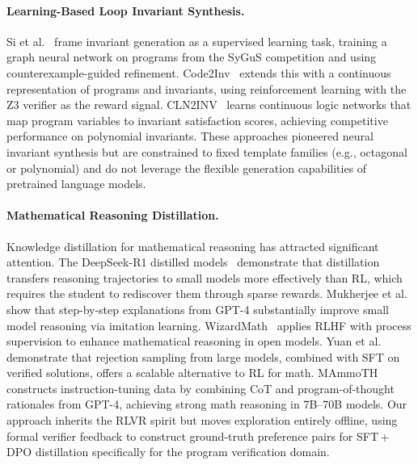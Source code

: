 \paragraph{Learning-Based Loop Invariant Synthesis.}
Si et al.~\citep{si2018learning} frame invariant generation as a
supervised learning task, training a graph neural network on
programs from the SyGuS competition and using counterexample-guided
refinement.
Code2Inv~\citep{si2020code2inv} extends this with a continuous
representation of programs and invariants, using reinforcement
learning with the Z3 verifier as the reward signal.
CLN2INV~\citep{ryan2020cln2inv} learns continuous logic networks
that map program variables to invariant satisfaction scores,
achieving competitive performance on polynomial invariants.
These approaches pioneered neural invariant synthesis but are
constrained to fixed template families (e.g., octagonal or
polynomial) and do not leverage the flexible generation
capabilities of pretrained language models.

\paragraph{Mathematical Reasoning Distillation.}
Knowledge distillation for mathematical reasoning has attracted
significant attention.
The DeepSeek-R1 distilled models~\citep{deepseekr1} demonstrate that
distillation transfers reasoning trajectories to small models more
effectively than RL, which requires the student to rediscover them
through sparse rewards.
Mukherjee et al.~\citep{mukherjee2023orca} show that step-by-step
explanations from GPT-4 substantially improve small model reasoning
via imitation learning.
WizardMath~\citep{luo2023wizardmath} applies RLHF with process
supervision to enhance mathematical reasoning in open models.
Yuan et al.~\citep{yuan2023scaling} demonstrate that rejection
sampling from large models, combined with SFT on verified solutions,
offers a scalable alternative to RL for math.
MAmmoTH~\citep{yue2024mammoth} constructs instruction-tuning data
by combining CoT and program-of-thought rationales from GPT-4,
achieving strong math reasoning in 7B--70B models.
Our approach inherits the RLVR spirit but moves exploration entirely
offline, using formal verifier feedback to construct ground-truth
preference pairs for SFT\,+\,DPO distillation specifically for
the program verification domain.

